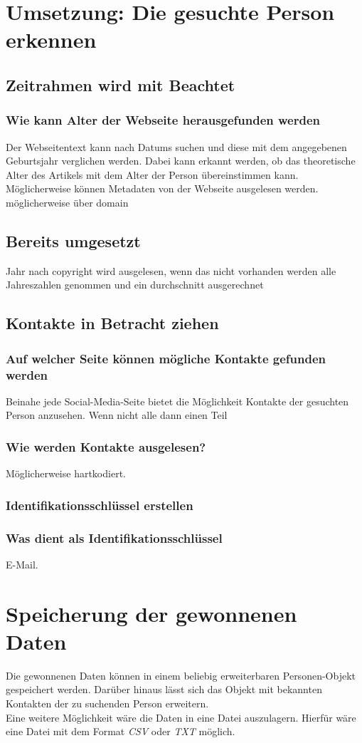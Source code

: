 \section{Umsetzung: Die gesuchte Person erkennen}
	\subsection{Zeitrahmen wird mit Beachtet}
		\subsubsection{Wie kann Alter der Webseite herausgefunden werden}
		Der Webseitentext kann nach Datums suchen und diese mit dem angegebenen Geburtsjahr verglichen werden. Dabei kann erkannt werden, ob das theoretische Alter des Artikels mit dem Alter der Person übereinstimmen kann. Möglicherweise können Metadaten von der Webseite ausgelesen werden.
		möglicherweise über domain
		\subsection{Bereits umgesetzt}
		Jahr nach copyright wird ausgelesen, wenn das nicht vorhanden werden alle Jahreszahlen genommen und ein durchschnitt ausgerechnet
	\subsection{Kontakte in Betracht ziehen}
		\subsubsection{Auf welcher Seite können mögliche Kontakte gefunden werden}
		Beinahe jede Social-Media-Seite bietet die Möglichkeit Kontakte der gesuchten Person anzusehen. Wenn nicht alle dann einen Teil
		\subsubsection{Wie werden Kontakte ausgelesen?}
		Möglicherweise hartkodiert.
	\subsubsection{Identifikationsschlüssel erstellen}
		\subsubsection{Was dient als Identifikationsschlüssel}
		E-Mail.

\section{Speicherung der gewonnenen Daten}
	Die gewonnenen Daten können in einem beliebig erweiterbaren Personen-Objekt gespeichert werden. Darüber hinaus lässt sich das Objekt mit bekannten Kontakten der zu suchenden Person erweitern.\\
	Eine weitere Möglichkeit wäre die Daten in eine Datei auszulagern. Hierfür wäre eine Datei mit dem Format \textit{CSV} oder \textit{TXT} möglich.